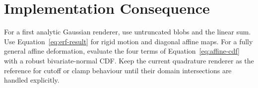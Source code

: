 \documentclass[11pt,a4paper]{article}
\begin{document}
\section{Implementation Consequence}

For a first analytic Gaussian renderer, use untruncated blobs and the linear
sum.  Use Equation~\eqref{eq:erf-result} for rigid motion and diagonal
affine maps.  For a fully general affine deformation, evaluate the four
terms of Equation~\eqref{eq:affine-cdf} with a robust bivariate-normal CDF.
Keep the current quadrature renderer as the reference for cutoff or clamp
behaviour until their domain intersections are handled explicitly.
\end{document}
